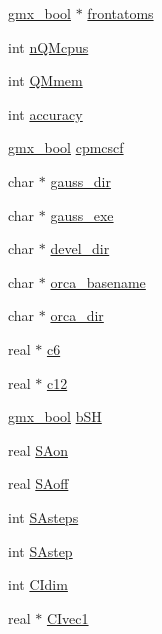 \begin{DoxyCompactItemize}
\item 
\hyperlink{include_2types_2simple_8h_a8fddad319f226e856400d190198d5151}{gmx\-\_\-bool} $\ast$ \hyperlink{structt__QMrec_a1c0232160491f07a7fec86a4f78939d3}{frontatoms}
\item 
int \hyperlink{structt__QMrec_a307677140e9a9a420146b6ee3d4b5013}{n\-Q\-Mcpus}
\item 
int \hyperlink{structt__QMrec_a405ff4e6f8f3d700a2b2ff02a70f369c}{\-Q\-Mmem}
\item 
int \hyperlink{structt__QMrec_a431537349b911462ca1293d1b2e59e55}{accuracy}
\item 
\hyperlink{include_2types_2simple_8h_a8fddad319f226e856400d190198d5151}{gmx\-\_\-bool} \hyperlink{structt__QMrec_aa40ed67b92ee0936370eedf439f1b377}{cpmcscf}
\item 
char $\ast$ \hyperlink{structt__QMrec_a1a5d4746ed9ef9cf3034f224096ff020}{gauss\-\_\-dir}
\item 
char $\ast$ \hyperlink{structt__QMrec_ae17d5e0134bd98c5e407b128c7306ea1}{gauss\-\_\-exe}
\item 
char $\ast$ \hyperlink{structt__QMrec_a15d49d038371e0db85e0fc313fa6e270}{devel\-\_\-dir}
\item 
char $\ast$ \hyperlink{structt__QMrec_a8e78d54361d508b32d6e5ef74ccdbc55}{orca\-\_\-basename}
\item 
char $\ast$ \hyperlink{structt__QMrec_aa75fdc96ee9243b4d159a71fc838fae0}{orca\-\_\-dir}
\item 
real $\ast$ \hyperlink{structt__QMrec_a9ed14ae86df5e78bc8ac8206435ac5f4}{c6}
\item 
real $\ast$ \hyperlink{structt__QMrec_a897329fbd601c483347c7fbd633c0bf2}{c12}
\item 
\hyperlink{include_2types_2simple_8h_a8fddad319f226e856400d190198d5151}{gmx\-\_\-bool} \hyperlink{structt__QMrec_ae8c61908c948f2fa5eac0730685b884c}{b\-S\-H}
\item 
real \hyperlink{structt__QMrec_a0d5df107eef3b30f1f5242f8f45b0643}{\-S\-Aon}
\item 
real \hyperlink{structt__QMrec_af7e566908bcd48212fc198abc308c641}{\-S\-Aoff}
\item 
int \hyperlink{structt__QMrec_ab8631b213d8159941f0fcd79b6bca105}{\-S\-Asteps}
\item 
int \hyperlink{structt__QMrec_a93962c8d9d84e03c06d6c5292ad7a052}{\-S\-Astep}
\item 
int \hyperlink{structt__QMrec_a5add0fae7da4c31a365cf9e84788a4f6}{\-C\-Idim}
\item 
real $\ast$ \hyperlink{structt__QMrec_a55ea4944b2c1b7e3abd42f93d088a66f}{\-C\-Ivec1}

\end{DoxyCompactItemize}
